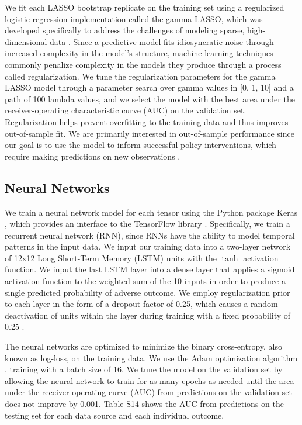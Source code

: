 \documentclass[9pt,twoside]{pnas-new}
\begin{document}
We fit each LASSO bootstrap replicate on the training set using a regularized logistic regression implementation called the gamma LASSO, which was developed specifically to address the challenges of modeling sparse, high-dimensional data \cite{taddy}. Since a predictive model fits idiosyncratic noise through increased complexity in the model's structure, machine learning techniques commonly penalize complexity in the models they produce through a process called regularization. We tune the regularization parameters for the gamma LASSO model through a parameter search over gamma values in [0, 1, 10] and a path of 100 lambda values, and we select the model with the best area under the receiver-operating characteristic curve (AUC) on the validation set. Regularization helps prevent overfitting to the training data and thus improves out-of-sample fit. We are primarily interested in out-of-sample performance since our goal is to use the model to inform successful policy interventions, which require making predictions on new observations \cite{kleinberg}.

\subsection{Neural Networks}

We train a neural network model for each tensor using the Python package Keras \cite{chollet}, which provides an interface to the TensorFlow library \cite{abadi}. Specifically, we train a recurrent neural network (RNN), since RNNs have the ability to model temporal patterns in the input data. We input our training data into a two-layer network of 12x12 Long Short-Term Memory (LSTM) \cite{hochreiter} units with the $\tanh$ activation function. We input the last LSTM layer into a dense layer that applies a sigmoid activation function to the weighted sum of the 10 inputs in order to produce a single predicted probability of adverse outcome. We employ regularization prior to each layer in the form of a dropout factor of 0.25, which causes a random deactivation of units within the layer during training with a fixed probability of 0.25 \cite{srivastava}.

The neural networks are optimized to minimize the binary cross-entropy, also known as log-loss, on the training data. We use the Adam optimization algorithm \cite{kingma}, training with a batch size of 16. We tune the model on the validation set by allowing the neural network to train for as many epochs as needed until the area under the receiver-operating curve (AUC) from predictions on the validation set does not improve by 0.001. Table S14 shows the AUC from predictions on the testing set for each data source and each individual outcome.
\end{document}
